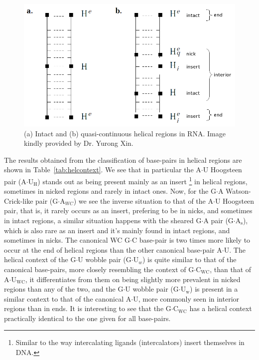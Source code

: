 \begin{figure}
\centering
\includegraphics[scale=0.4]{Chapter3/helcontext.png}
\caption{(a)  Intact  and  (b)  quasi-continuous  helical  regions  in
  RNA. Image kindly provided by Dr. Yurong Xin.}
\label{fig:helregxin}
\end{figure}  

The results obtained from  the classification of base-pairs in helical
regions  are  shown in  Table~\ref{tab:helcontext}.   We  see that  in
particular  the   A$\cdot$U  Hoogsteen  pair  (A$\cdot$U$_{\text{H}}$)
stands out as  being present mainly as an  insert \footnote{Similar to
  the way  intercalating ligands (intercalators)  insert themselves in
  DNA.} in helical regions, sometimes  in nicked regions and rarely in
intact   ones.   Now,   for  the   G$\cdot$A   Watson-Crick-like  pair
(G$\cdot$A$_{WC}$)  we  see  the  inverse  situation to  that  of  the
A$\cdot$U  Hoogsteen pair,  that is,  it rarely  occurs as  an insert,
prefering to be  in nicks, and sometimes in  intact regions, a similar
situation     happens    with     the    sheared     G$\cdot$A    pair
(G$\cdot$A$_{\text{s}}$),  which is also  rare as  an insert  and it's
mainly found in intact regions, and sometimes in nicks.  The canonical
WC G$\cdot$C base-pair is two times more likely to occur at the end of
helical  regions than  the other  canonical base-pair  A$\cdot$U.  The
helical  context of  the  G$\cdot$U wobble  pair (G$\cdot$U$_{w}$)  is
quite  similar  to that  of  the  canonical  base-pairs, more  closely
resembling  the  context  of  G$\cdot$C$_{\text{WC}}$,  than  that  of
A$\cdot$U$_{\text{WC}}$, it differentiates from them on being slightly
more prevalent  in nicked regions  than any of  the two, and  the G$\cdot$U
wobble pair (G$\cdot$U$_{\text{w}}$) is present in a similar context to
that of the canonical A$\cdot$U, more commonly seen in interior regions
than    in   ends.    It   is    interesting   to    see    that   the
G$\cdot$C$_{\text{WC}}$ has a helical context practically identical to
the one given for all base-pairs.

